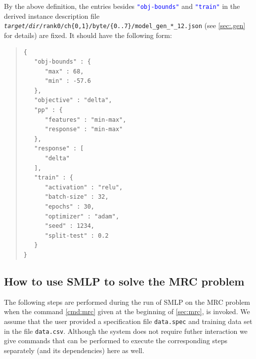\documentclass[a4paper,parskip=half]{article} %
\newcommand*\cmdstyle\texttt
\newcommand*\file\cmdstyle
\newcommand*\literalColor{blue}
\newcommand*\literal[1]{\textcolor{\literalColor}{\cmdstyle{#1}}}
\newcommand*\SolverAbbrvText{SMLP}
\newcommand*\SolverAbbrv{\SolverAbbrvText\xspace}
\begin{document}
By the above definition, the entries besides
\literal{"obj-bounds"} and \literal{"train"}
in the derived instance description file
\file{\emph{target/dir}/rank0/ch\{0,1\}/byte/\{0..7\}/model\_gen\_*\_12.json}
(see \cref{sec:.gen} for details) are fixed.
It should have the following form:
\begin{quote}\footnotesize\color{\literalColor}\begin{verbatim}
{
   "obj-bounds" : {
      "max" : 68,
      "min" : -57.6
   },
   "objective" : "delta",
   "pp" : {
      "features" : "min-max",
      "response" : "min-max"
   },
   "response" : [
      "delta"
   ],
   "train" : {
      "activation" : "relu",
      "batch-size" : 32,
      "epochs" : 30,
      "optimizer" : "adam",
      "seed" : 1234,
      "split-test" : 0.2
   }
}
\end{verbatim}\end{quote}


\subsection{How to use \SolverAbbrv to solve the MRC problem}

The following steps are performed during the run of \SolverAbbrv on the MRC
problem when the command \eqref{cmd:mrc}  given at the beginning of
\cref{sec:mrc}, is invoked. We assume that the user provided a specification
file \file{data.spec} and training data set in the file \file{data.csv}.
Although the system does not require futher interaction we give commands that
can be performed to execute the corresponding steps separately  (and its
dependencies) here as well.
\end{document}
